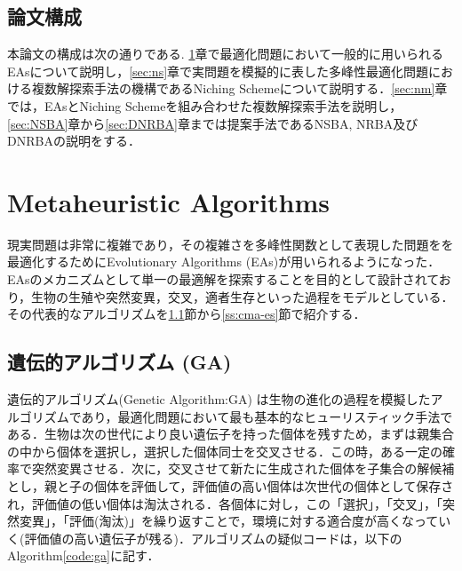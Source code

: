 \documentclass[a4j,11pt]{jarticle}
\def\proposed{DNRBA}
\def\proposedJ{適応的個体間距離に基づく複数解探索型Bat Algorithm}
\begin{document}
\subsection{論文構成}
本論文の構成は次の通りである.
\ref{sec:MA}章で最適化問題において一般的に用いられるEAsについて説明し，\ref{sec:ns}章で実問題を模擬的に表した多峰性最適化問題における複数解探索手法の機構であるNiching Schemeについて説明する．\ref{sec:nm}章では，EAsとNiching Schemeを組み合わせた複数解探索手法を説明し，\ref{sec:NSBA}章から\ref{sec:DNRBA}章までは提案手法であるNSBA, NRBA及びDNRBAの説明をする．



\newpage
\section{Metaheuristic Algorithms}

\label{sec:MA}

現実問題は非常に複雑であり，その複雑さを多峰性関数として表現した問題をを最適化するためにEvolutionary Algorithms (EAs)が用いられるようになった．EAsのメカニズムとして単一の最適解を探索することを目的として設計されており，生物の生殖や突然変異，交叉，適者生存といった過程をモデルとしている．その代表的なアルゴリズムを\ref{ss:GA}節から\ref{ss:cma-es}節で紹介する．

\subsection{遺伝的アルゴリズム (GA)}
\label{ss:GA}
遺伝的アルゴリズム(Genetic Algorithm:GA) \cite{GA} は生物の進化の過程を模擬したアルゴリズムであり，最適化問題において最も基本的なヒューリスティック手法である．生物は次の世代により良い遺伝子を持った個体を残すため，まずは親集合の中から個体を選択し，選択した個体同士を交叉させる．この時，ある一定の確率で突然変異させる．次に，交叉させて新たに生成された個体を子集合の解候補とし，親と子の個体を評価して，評価値の高い個体は次世代の個体として保存され，評価値の低い個体は淘汰される．各個体に対し，この「選択」，「交叉」，「突然変異」，「評価(淘汰)」を繰り返すことで，環境に対する適合度が高くなっていく(評価値の高い遺伝子が残る)．アルゴリズムの疑似コードは，以下のAlgorithm\ref{code:ga}に記す．
\end{document}
